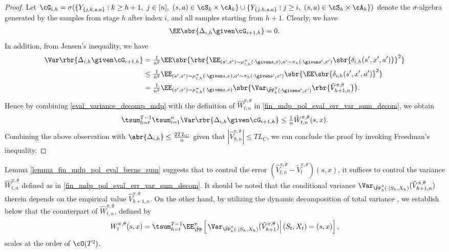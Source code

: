\documentclass[9pt]{article}
\numberwithin{equation}{section}
\renewcommand{\frac}[2]{\tfrac{#1}{#2}}
\begin{document}
\begin{proof}
Let 
$
\cG_{i,h}
=
\sigma (
\{Y_{\{j,k,s,a\}}: k\geq h+1,\ j\in[n],\ (s,a)\in\cS_k\times\cA_k\}
\cup
\{Y_{\{j,h,s,a\}}: j\ge i,\ (s,a)\in\cS_h\times\cA_h\}
)
$
denote the $\sigma$-algebra generated by the samples from stage $h$ after index $i$, and all samples starting from $h+1$.
Clearly, we have
\begin{align*}
    \EE\sbr{\Delta_{i,h}\given \cG_{i+1,h}}=
    0 .
\end{align*}
In addition, from Jensen's inequality, we have
\begin{align}
    \Var\rbr{\Delta_{i,h}\given \cG_{i+1,h}}
    & = \frac{1}{n^2} \EE \sbr{ \rbr{
    \EE_{{(s',x')\sim \mu_{t,h}^{\pi}(\cdot\given s,x) 
    , a'\sim \pi_h(\cdot\given s',x')}}
    \sbr{
   \delta_{i, h}(s', x', a')
    }
    }^2
    } \nonumber  \\
    & \leq 
    \frac{1}{n^2} \EE_{{(s',x')\sim \mu_{t,h}^{\pi}(\cdot\given s,x) 
    , a'\sim \pi_h(\cdot\given s',x')}} \sbr{ 
    \EE \sbr{
   \delta_{i, h}(s', x', a')
    }^2
    } \nonumber  \\
    & =
    \frac{1}{n^2}
    \EE_{(s',x')\sim \mu_{t,h}^{\pi}(\cdot\given s,x)}
    \sbr{
    \Var_{\tilde{\PP}_h^\pi(\cdot\given s',x')}
    \rbr{\hat V_{h+1,n}^{\pi,\theta}}
    } . \label{eval_variance_decomp_mdp}
\end{align}
Hence by combining \eqref{eval_variance_decomp_mdp} with the definition of $\hat{W}_{t,n}^{\pi, \theta}$ in \eqref{fin_mdp_pol_eval_err_var_sum_decom}, we obtain
\begin{align*}
    \tsum_{h=t}^{T-1}\tsum_{i=1}^n
    \Var\rbr{\Delta_{i,h}\given \cG_{i+1,h}}
    \le
    \frac{1}{n}\hat W_{t,n}^{\pi,\theta}(s,x).
\end{align*}
Combining the above observation with  $
\abr{\Delta_{i,h}}\leq \frac{2T L_C}{n}$ given that $|{\hat{V}^{\pi,\theta}_{h,n}}| 
\leq TL_C$, we can conclude the proof by invoking  Freedman's inequality. 
\end{proof}

Lemma \ref{lemma_fin_mdp_pol_eval_berns_sum} suggests that to control the error $(\hat{V}_{t,n}^{\pi, \theta} - \tilde{V}_t^{\pi, \theta})(s,x)$, it suffices to control the variance 
$\hat{W}_{t,n}^{\pi, \theta}$ defined as in \eqref{fin_mdp_pol_eval_err_var_sum_decom}.
It should be noted that the conditional variance  
$\Var_{\tilde{\PP}_h^\pi (\cdot|S_{h}, X_{h})} (\hat{V}_{h+1,n}^{\pi, \theta}) $ therein depends on the empirical value $\hat{V}_{h+1,n}^{\pi, \theta}$.
On the other hand, by utilizing the dynamic decomposition of total variance \cite{gheshlaghi2013minimax, azar2017minimax, agarwal2020model,sidford2018near}, we establish below that the counterpart of $\hat{W}_{t,n}^{\pi, \theta}$, defined by 
\begin{align*}
        {W}_{t}^{\pi, \theta}(s,x) =  \tsum_{h = t}^{T-1} \EE_{\tilde \PP}^\pi \left[ \left. \Var_{\tilde{\PP}_h^\pi (\cdot|S_{h}, X_{h})} (\tilde{V}_{h+1}^{\pi, \theta}) \right| (S_t, X_t) = (s,x) \right],
\end{align*}
scales at the order of $\cO(T^2)$.
\end{document}
